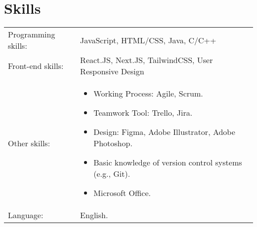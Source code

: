 \documentclass[a4paper,11pt]{article}
\begin{document}
\section{Skills}
\begin{tabularx}{\linewidth}{@{}l X@{}}
Programming skills: &  \normalsize{JavaScript, HTML/CSS, Java, C/C++}\\
Front-end skills:  &  \normalsize{React.JS, Next.JS, TailwindCSS, User Responsive Design}\\
Other skills:  & 
\begin{itemize}[nosep,after=\strut, leftmargin=1em, itemsep=3pt]
        \item Working Process: Agile, Scrum.
        \item Teamwork Tool: Trello, Jira.
        \item Design: Figma, Adobe Illustrator, Adobe Photoshop.
        \item Basic knowledge of version control systems (e.g., Git).
        \item Microsoft Office.
    \end{itemize}\\  
Language:  &  \normalsize{English.}\\
\end{tabularx}

\vfill
{}
\end{document}
